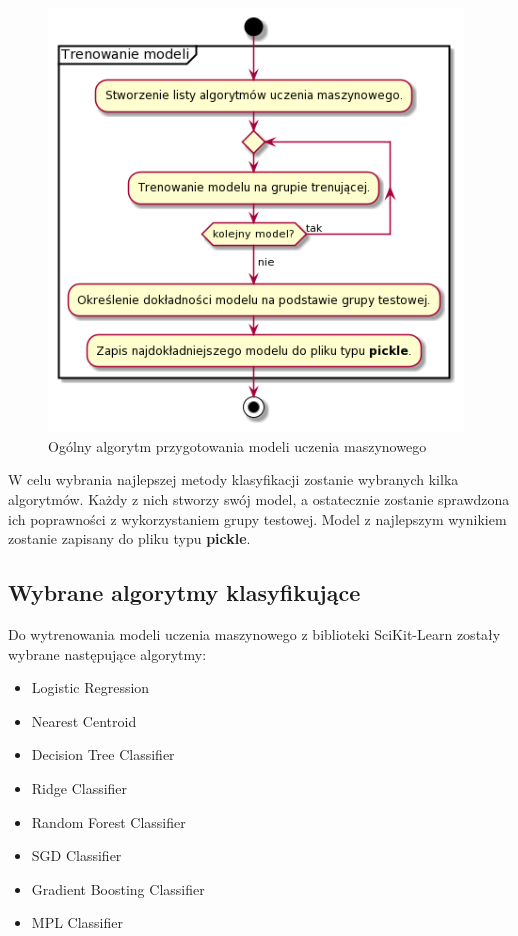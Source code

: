 \begin{figure}[H]
    \begin{center}
        \includegraphics[width=11cm]{../images/train_models.png}
        \caption{Ogólny algorytm przygotowania modeli uczenia maszynowego}
    \end{center}
\end{figure}

\quad W celu wybrania najlepszej metody klasyfikacji zostanie wybranych kilka algorytmów. Każdy z nich stworzy swój model, a ostatecznie zostanie sprawdzona ich poprawności z wykorzystaniem grupy testowej. Model z najlepszym wynikiem zostanie zapisany do pliku typu \textbf{pickle}.

\subsection{Wybrane algorytmy klasyfikujące}

\quad Do wytrenowania modeli uczenia maszynowego z biblioteki SciKit-Learn zostały wybrane następujące algorytmy:

\begin{itemize}
    \item Logistic Regression %
    \item Nearest Centroid 
    \item Decision Tree Classifier
    \item Ridge Classifier 
    \item Random Forest Classifier 
    \item SGD Classifier
    \item Gradient Boosting Classifier
    \item MPL Classifier
\end{itemize}

